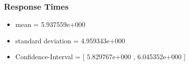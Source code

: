 \documentclass[aps,letterpaper,10pt]{revtex4}
\begin{document}
        \subsubsection{Response Times}
            \begin{itemize}
                \item mean = 5.937559e+000
                \item standard deviation = 4.959343e+000
                \item Confidence-Interval = [ 5.829767e+000 , 6.045352e+000 ]
            \end{itemize}
            \begin{figure}[htp]
                \begin{center}
                \end{center}
            \end{figure}

        \newpage
\end{document}
